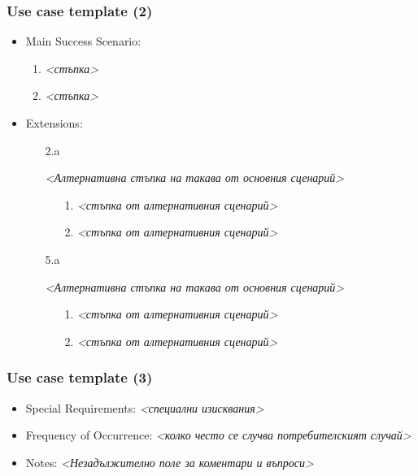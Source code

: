 \documentclass[12pt]{beamer}
\begin{document}
\begin{frame}[fragile]
\frametitle{Use case template (2)}
\begin{itemize}
	\item {Main Success Scenario:
		\begin{enumerate}
			\item \textit{<стъпка>}
			\item \textit{<стъпка>}
		\end{enumerate}
	}
	\item {Extensions:
		\begin{itemize}
			\item[2.a] {\textit{<Алтернативна стъпка на такава от основния сценарий>}
				\begin{enumerate}
					\item[1.] \textit{<стъпка от алтернативния сценарий>}
					\item[2.] \textit{<стъпка от алтернативния сценарий>}                
				\end{enumerate}
			}
			\item[5.a] {\textit{<Алтернативна стъпка на такава от основния сценарий>}
				\begin{enumerate}
					\item[1.] \textit{<стъпка от алтернативния сценарий>}
					\item[2.] \textit{<стъпка от алтернативния сценарий>}                
				\end{enumerate}
			}
		\end{itemize}
	}                
\end{itemize}
\end{frame}

\begin{frame}[fragile]
\frametitle{Use case template (3)}
\begin{itemize}
	\item Special Requirements: \textit{<специални изисквания>}
	\item Frequency of Occurrence: \textit{<колко често се случва потребителският случай>}
	\item Notes: \textit{<Незадължително поле за коментари и въпроси>}
\end{itemize}
\end{frame}
\end{document}
